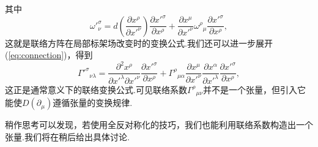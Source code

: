 		其中
		\begin{equation}\label{eq:connection}
		{\omega'}^\sigma_\nu=d\left(\frac{\partial{x^\rho}}{\partial{x'}^\nu}\right)\frac{\partial{{x'}^\sigma}}{\partial{x^\rho}}+\frac{\partial{x^\mu}}{\partial{x'}^\nu}{\omega^\rho}_\mu\frac{\partial{{x'}^\sigma}}{\partial{x^\rho}},
		\end{equation}
		这就是联络方阵在局部标架场改变时的变换公式.我们还可以进一步展开(\ref{eq:connection})，得到
		\begin{equation}
		{{\varGamma'}^\sigma}_{\nu\lambda}=\frac{\partial^2{x^\rho}}{\partial{x'}^\lambda\partial{x'}^\nu}\frac{\partial{{x'}^\sigma}}{\partial{x^\rho}}+{\varGamma^\rho}_{\mu\alpha}\frac{\partial{x^\mu}}{\partial{x'}^\nu}\frac{\partial{x}^\alpha}{\partial{x'}^\lambda}\frac{\partial{{x'}^\sigma}}{\partial{x^\rho}},
		\end{equation}
		这正是通常意义下的联络变换公式.可见联络系数${\varGamma^\rho}_{\mu\nu}$并不是一个张量，但引入它能使$D(\partial_\mu)$遵循张量的变换规律.
		
		稍作思考可以发现，若使用全反对称化的技巧，我们也能利用联络系数构造出一个张量.我们将在稍后给出具体讨论.

